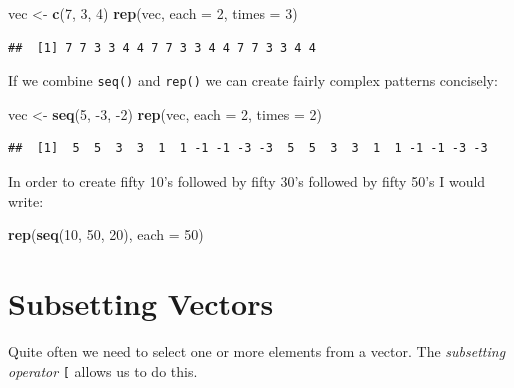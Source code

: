 \documentclass[]{book}
\makeatletter
\newenvironment{Shaded}{\begin{snugshade}}{\end{snugshade}}
\newcommand{\KeywordTok}[1]{\textcolor[rgb]{0.13,0.29,0.53}{\textbf{{#1}}}}
\newcommand{\DataTypeTok}[1]{\textcolor[rgb]{0.13,0.29,0.53}{{#1}}}
\newcommand{\DecValTok}[1]{\textcolor[rgb]{0.00,0.00,0.81}{{#1}}}
\newcommand{\StringTok}[1]{\textcolor[rgb]{0.31,0.60,0.02}{{#1}}}
\newcommand{\NormalTok}[1]{{#1}}
\newenvironment{kframe}{%
\medskip{}
\setlength{\fboxsep}{.8em}
 \def\at@end@of@kframe{}%
 \ifinner\ifhmode%
  \def\at@end@of@kframe{\end{minipage}}%
  \begin{minipage}{\columnwidth}%
 \fi\fi%
 \def\FrameCommand##1{\hskip\@totalleftmargin \hskip-\fboxsep
 \colorbox{shadecolor}{##1}\hskip-\fboxsep
     \hskip-\linewidth \hskip-\@totalleftmargin \hskip\columnwidth}%
 \MakeFramed {\advance\hsize-\width
   \@totalleftmargin\z@ \linewidth\hsize
   \@setminipage}}%
 {\par\unskip\endMakeFramed%
 \at@end@of@kframe}
\renewenvironment{Shaded}{\begin{kframe}}{\end{kframe}}
\theoremstyle{definition}
\theoremstyle{definition}
\theoremstyle{remark}
\makeatother
\begin{document}
\begin{Shaded}
\begin{Highlighting}[]
\NormalTok{vec <-}\StringTok{ }\KeywordTok{c}\NormalTok{(}\DecValTok{7}\NormalTok{, }\DecValTok{3}\NormalTok{, }\DecValTok{4}\NormalTok{)}
\KeywordTok{rep}\NormalTok{(vec, }\DataTypeTok{each =} \DecValTok{2}\NormalTok{, }\DataTypeTok{times =} \DecValTok{3}\NormalTok{)}
\end{Highlighting}
\end{Shaded}

\begin{verbatim}
##  [1] 7 7 3 3 4 4 7 7 3 3 4 4 7 7 3 3 4 4
\end{verbatim}

If we combine \texttt{seq()} and \texttt{rep()} we can create fairly
complex patterns concisely:

\begin{Shaded}
\begin{Highlighting}[]
\NormalTok{vec <-}\StringTok{ }\KeywordTok{seq}\NormalTok{(}\DecValTok{5}\NormalTok{, -}\DecValTok{3}\NormalTok{, -}\DecValTok{2}\NormalTok{)}
\KeywordTok{rep}\NormalTok{(vec, }\DataTypeTok{each =} \DecValTok{2}\NormalTok{, }\DataTypeTok{times =} \DecValTok{2}\NormalTok{)}
\end{Highlighting}
\end{Shaded}

\begin{verbatim}
##  [1]  5  5  3  3  1  1 -1 -1 -3 -3  5  5  3  3  1  1 -1 -1 -3 -3
\end{verbatim}

In order to create fifty 10's followed by fifty 30's followed by fifty
50's I would write:

\begin{Shaded}
\begin{Highlighting}[]
\KeywordTok{rep}\NormalTok{(}\KeywordTok{seq}\NormalTok{(}\DecValTok{10}\NormalTok{, }\DecValTok{50}\NormalTok{, }\DecValTok{20}\NormalTok{), }\DataTypeTok{each =} \DecValTok{50}\NormalTok{)}
\end{Highlighting}
\end{Shaded}

\section{Subsetting Vectors}\label{subsetting-vectors}

Quite often we need to select one or more elements from a vector. The
\emph{subsetting operator} \texttt{{[}}
\index{R-operators![ (subsetting)} allows us to do this.
\end{document}

